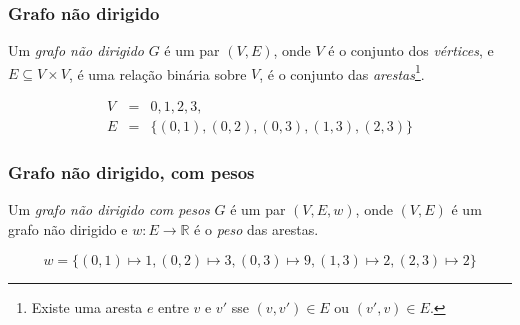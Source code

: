 \documentclass{beamer}
\begin{document}
\begin{frame}
\frametitle{Grafo não dirigido}

\begin{definition}
Um \emph{grafo não dirigido} $G$ é um par $(V, E)$, onde $V$ é o conjunto dos
\emph{vértices}, e $E \subseteq V \times V$, é uma relação binária sobre $V$, é
o conjunto das \emph{arestas}\footnote{Existe uma aresta $e$ entre $v$ e $v'$
  sse $(v, v') \in E$ ou $(v', v) \in E$.}.
\end{definition}

\begin{center}
$$
\begin{array}{rcl}
V & = & {0, 1, 2, 3}, \\
E & = &\{ (0,1), (0,2), (0,3), (1, 3), (2,3) \}
\end{array}
$$ %
\end{center}

\end{frame}

\begin{frame}
\frametitle{Grafo não dirigido, com pesos}

\begin{definition}
Um \emph{grafo não dirigido com pesos} $G$ é um par $(V, E, w)$, onde $(V, E)$ é
um grafo não dirigido e $w: E \rightarrow \mathbb{R}$ é o \emph{peso} das
arestas.
\end{definition}

\begin{center}
\end{center}
$$w = \{ (0, 1) \mapsto
1, (0, 2) \mapsto 3, (0,3) \mapsto 9, (1,3) \mapsto 2, (2, 3) \mapsto 2 \}
$$

\end{frame}
\end{document}
